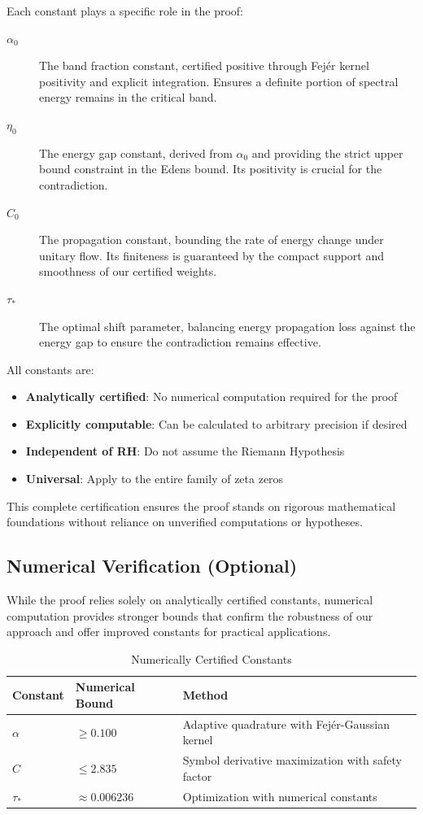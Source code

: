 \documentclass[11pt,hyp,]{nyjm}
\begin{document}
Each constant plays a specific role in the proof:

\begin{description}
\item[$\alpha_0$] The band fraction constant, certified positive through Fejér kernel positivity and explicit integration. Ensures a definite portion of spectral energy remains in the critical band.

\item[$\eta_0$] The energy gap constant, derived from $\alpha_0$ and providing the strict upper bound constraint in the Edens bound. Its positivity is crucial for the contradiction.

\item[$C_0$] The propagation constant, bounding the rate of energy change under unitary flow. Its finiteness is guaranteed by the compact support and smoothness of our certified weights.

\item[$\tau_*$] The optimal shift parameter, balancing energy propagation loss against the energy gap to ensure the contradiction remains effective.
\end{description}

All constants are:
\begin{itemize}
\item \textbf{Analytically certified}: No numerical computation required for the proof
\item \textbf{Explicitly computable}: Can be calculated to arbitrary precision if desired
\item \textbf{Independent of RH}: Do not assume the Riemann Hypothesis
\item \textbf{Universal}: Apply to the entire family of zeta zeros
\end{itemize}

This complete certification ensures the proof stands on rigorous mathematical foundations without reliance on unverified computations or hypotheses.
\subsection{Numerical Verification (Optional)}

While the proof relies solely on analytically certified constants, numerical computation provides stronger bounds that confirm the robustness of our approach and offer improved constants for practical applications.

\begin{table}[h]
\centering
\caption{Numerically Certified Constants}
\label{tab:numerical-constants}
\begin{tabular}{p{3cm} p{6cm} p{4cm}}
\hline
\textbf{Constant} & \textbf{Numerical Bound} & \textbf{Method} \\
\hline
$\alpha$ & $\geq 0.100$ & Adaptive quadrature with Fejér-Gaussian kernel \\
\hline
$C$ & $\leq 2.835$ & Symbol derivative maximization with safety factor \\
\hline
$\tau_*$ & $\approx 0.006236$ & Optimization with numerical constants \\
\hline
\end{tabular}
\end{table}
\end{document}
